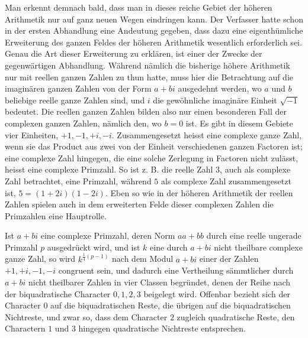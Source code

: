 \documentclass[12pt]{article}
\begin{document}
Man erkennt demnach bald, dass man in dieses reiche Gebiet der höheren Arithmetik nur auf ganz neuen Wegen eindringen kann. Der Verfasser hatte schon in der ersten Abhandlung eine Andeutung gegeben, dass dazu eine eigenthümliche Erweiterung des ganzen Feldes der höheren Arithmetik wesentlich erforderlich sei. Genau die Art dieser Erweiterung zu erklären, ist einer der Zwecke der gegenwärtigen Abhandlung. Während nämlich die bisherige höhere Arithmetik nur mit reellen ganzen Zahlen zu thun hatte, muss hier die Betrachtung auf die imaginären ganzen Zahlen von der Form $a+bi$ ausgedehnt werden, wo $a$ und $b$ beliebige reelle ganze Zahlen sind, und $i$ die gewöhnliche imaginäre Einheit $\sqrt{-1}$ bedeutet. Die reellen ganzen Zahlen bilden also nur einen besonderen Fall der complexen ganzen Zahlen, nämlich den, wo $b=0$ ist. Es gibt in diesem Gebiete vier Einheiten, $+1,-1,+i,-i$. Zusammengesetzt heisst eine complexe ganze Zahl, wenn sie das Product aus zwei von der Einheit verschiedenen ganzen Factoren ist; eine complexe Zahl hingegen, die eine solche Zerlegung in Factoren nicht zulässt, heisst eine complexe Primzahl. So ist z. B. die reelle Zahl $3$, auch als complexe Zahl betrachtet, eine Primzahl, während $5$ als complexe Zahl zusammengesetzt ist, $5=(1+2i)(1-2i)$. Eben so wie in der höheren Arithmetik der reellen Zahlen spielen auch in dem erweiterten Felde dieser complexen Zahlen die Primzahlen eine Hauptrolle.

Ist $a+bi$ eine complexe Primzahl, deren Norm $aa+bb$ durch eine reelle ungerade Primzahl $p$ ausgedrückt wird, und ist $k$ eine durch $a+bi$ nicht theilbare complexe ganze Zahl, so wird $k^{\frac14(p-1)}$ nach dem Modul $a+bi$ einer der Zahlen $+1,+i,-1,-i$ congruent sein, und dadurch eine Vertheilung sämmtlicher durch $a+bi$ nicht theilbarer Zahlen in vier Classen begründet, denen der Reihe nach der biquadratische Character $0,1,2,3$ beigelegt wird. Offenbar bezieht sich der Character $0$ auf die biquadratischen Reste, die übrigen auf die biquadratischen Nichtreste, und zwar so, dass dem Character $2$ zugleich quadratische Reste, den Charactern $1$ und $3$ hingegen quadratische Nichtreste entsprechen.
\end{document}
